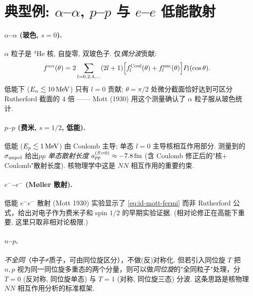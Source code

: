 \section{典型例: $\alpha$--$\alpha$, $p$--$p$ 与 $e$--$e$ 低能散射}\label{sec:id-examples-summary}

\paragraph{$\alpha$--$\alpha$ (玻色, $s=0$).}\quad $\alpha$ 粒子是 $^4$He 核, 自旋零, 双玻色子. 仅\emph{偶分波}贡献:
\begin{equation}
  f^{\alpha\alpha}(\theta)=2\sum_{l=0,2,4,\ldots}(2l+1)\Bigl[f_l^{\rm Coul}(\theta)+f_l^{\rm nuc}(\theta)\Bigr]P_l(\cos\theta).
\end{equation}
低能下 ($E_\alpha\lesssim 10\,{\rm MeV}$) 只有 $l=0$ 贡献; $\theta=\pi/2$ 处微分截面恰好达到可区分 Rutherford 截面的 $4$ 倍 —— Mott (1930) 用这个测量确认了 $\alpha$ 粒子服从玻色统计.

\paragraph{$p$--$p$ (费米, $s=1/2$, 低能).}\quad 低能 ($E_p\lesssim 1\,{\rm MeV}$) 由 Coulomb 主导; 单态 $l=0$ 主导核相互作用部分. 测量到的 $\sigma_{\rm unpol}$ 给出\emph{$pp$ 单态散射长度} $a_{pp}^{(S=0)}\approx -7.8\,{\rm fm}$ (含 Coulomb 修正后的"核+ Coulomb"散射长度). 核物理学中这是 $NN$ 相互作用的重要约束.

\paragraph{$e^-$--$e^-$ (M{\o}ller 散射).}\quad 低能 $e^-e^-$ 散射 (Mott 1930) 实验显示了 \eqref{eq:id-mott-fermi} 而非 Rutherford 公式，给出对电子作为费米子和 spin $1/2$ 的早期实验证据. (相对论修正在高能下重要, 这里只取非相对论极限.)

\paragraph{$n$--$p$.}\quad \emph{不全同}（中子≠质子，可由同位旋区分），不做(反)对称化. 但若引入同位旋 $T$ 把 $n,p$ 视为同一同位旋多重态的两个分量，则可以做\emph{同位旋}的"全同粒子"处理，分 $T=0$ (反对称, 同位旋单态) 与 $T=1$ (对称, 同位旋三态) 分波. 这条思路是核物理 $NN$ 相互作用分析的标准框架.

